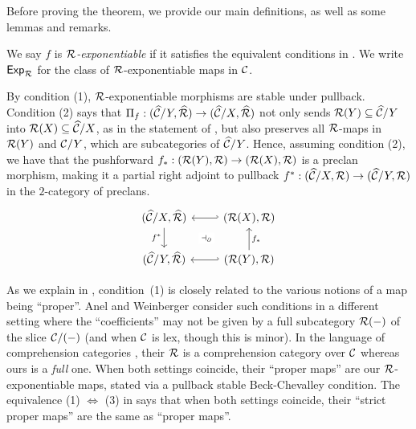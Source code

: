 Before proving the theorem,
we provide our main definitions,
as well as some lemmas and remarks.

\begin{definition} \label{def:exponentiable}
  We say $f$ is \emph{$\mathcal{R}$-exponentiable}
  if it satisfies the equivalent conditions in .
  We write $\mathsf{Exp}_{\mathcal{R}}$ for the class of $\mathcal{R}$-exponentiable maps in $\mathcal{C}$.
\end{definition}

By condition (1), $\mathcal{R}$-exponentiable morphisms
are stable under pullback.
Condition (2) says that $\Pi_f : (\widehat{\mathcal{C}}/Y, \widehat{\mathcal{R}}) \to (\widehat{\mathcal{C}}/X, \widehat{\mathcal{R}})$
not only sends $\mathcal{R}(Y) \subseteq \widehat{\mathcal{C}} / Y$ into $\mathcal{R}(X) \subseteq \widehat{\mathcal{C}} / X$,
as in the statement of ,
but also preserves all $\mathcal{R}$-maps in
$\mathcal{R}(Y)$ and $\mathcal{C} / Y$, which are subcategories of $\widehat{\mathcal{C}}/Y$.
Hence, assuming condition (2),
we have that the pushforward $f_* : (\mathcal{R}(Y), \mathcal{R}) \to (\mathcal{R}(X), \mathcal{R})$
is a preclan morphism,
making it a partial right adjoint 
to pullback $f^* : (\widehat{\mathcal{C}}/X, \mathcal{R}) \to (\widehat{\mathcal{C}} /Y, \mathcal{R})$
in the $2$-category of preclans.
  \[\begin{tikzcd}
    (\wCC / X, \wRR) & {(\RR(X), \RR)} \\
    (\wCC / Y, \wRR) & {(\RR(Y), \RR)}
    \arrow[""{name=0, anchor=center, inner sep=0}, "f^*"', from=1-1, to=2-1]
    \arrow[hook', from=1-2, to=1-1]
    \arrow[""{name=1, anchor=center, inner sep=0}, "{f_*}"', from=2-2, to=1-2]
    \arrow[hook', from=2-2, to=2-1]
    \arrow["{\dashv_\partial}"{description}, draw=none, from=0, to=1]
  \end{tikzcd}\]

As we explain in ,
condition~(1) is closely related to the
various notions of a map being ``proper''.
Anel and Weinberger \cite{anel2024} consider such conditions
in a different setting where the ``coefficients'' may not be given by
a full subcategory $\mathcal{R}(-)$ of the slice $\mathcal{C}/(-)$
(and when $\mathcal{C}$ is lex, though this is minor).
In the language of comprehension categories \cite{jacobs1993},
their $\mathcal{R}$ is a comprehension category over $\mathcal{C}$
whereas ours is a \emph{full} one.
When both settings coincide,
their ``proper maps'' are our $\mathcal{R}$-exponentiable maps,
stated via a pullback stable Beck-Chevalley condition.
The equivalence (1) $\Leftrightarrow$ (3) in  
says that when both settings coincide,
their ``strict proper maps'' are the same as ``proper maps''.

